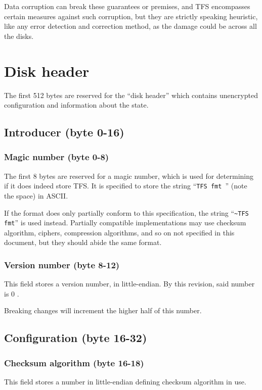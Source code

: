 \documentclass[11pt,a4paper]{report}
\newcommand{\clustersize}{512 }
\newcommand{\versionnumber}{0 }
\begin{document}
        Data corruption can break these guarantees or premises, and TFS
        encompasses certain measures against such corruption, but they are
        strictly speaking heuristic, like any error detection and correction
        method, as the damage could be across all the disks.

    \chapter{Disk header}
    The first \clustersize bytes are reserved for the ``disk header'' which
    contains unencrypted configuration and information about the state.

    \section{Introducer (byte 0-16)}
        \subsection{Magic number (byte 0-8)}
        The first 8 bytes are reserved for a magic number, which is used for
        determining if it does indeed store TFS\@. It is specified to store the
        string ``\texttt{TFS fmt }'' (note the space) in ASCII.

        If the format does only partially conform to this specification, the
        string ``\texttt{\textasciitilde TFS fmt}'' is used instead. Partially
        compatible implementations may use checksum algorithm, ciphers,
        compression algorithms, and so on not specified in this document, but
        they should abide the same format.

        \subsection{Version number (byte 8-12)}
        \label{header:versionnumber}
        This field stores a version number, in little-endian. By this revision,
        said number is \versionnumber.

        Breaking changes will increment the higher half of this number.

    \section{Configuration (byte 16-32)}
        \subsection{Checksum algorithm (byte 16-18)}
        \label{config:checksum}
        This field stores a number in little-endian defining checksum algorithm
        in use.
\end{document}
